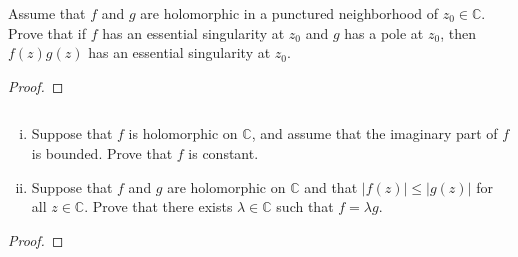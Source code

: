 \documentclass{article}
\newenvironment{problem}[2][Problem]{\begin{trivlist}
\item[\hskip \labelsep {\bfseries #1}\hskip \labelsep {\bfseries #2.}]}{\end{trivlist}}
\begin{document}
\pagebreak

\begin{problem}{3}
  Assume that $f$ and $g$ are holomorphic in a punctured neighborhood of
  $z_0 \in \mathbb C$. Prove that if $f$ has an essential singularity at $z_0$
  and $g$ has a pole at $z_0$, then $f(z)g(z)$ has an essential singularity at
  $z_0$.
\end{problem}

\begin{proof}
\end{proof}

\pagebreak

\begin{problem}{4}$ $\\
  \begin{enumerate}[(i)]
    \item Suppose that $f$ is holomorphic on $\mathbb C$, and assume that the
      imaginary part of $f$ is bounded. Prove that $f$ is constant.
    \item Suppose that $f$ and $g$ are holomorphic on $\mathbb C$ and that
    $|f(z)| \leq |g(z)|$ for all $z \in \mathbb C$. Prove that there exists
    $\lambda \in \mathbb C$ such that $f = \lambda g$.
  \end{enumerate}
\end{problem}

\begin{proof}
\end{proof}
\end{document}
